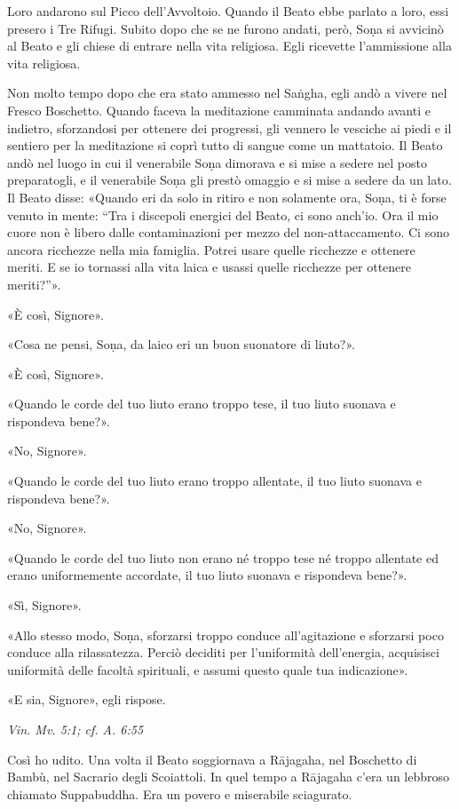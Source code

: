 Loro andarono sul Picco dell’Avvoltoio. Quando il Beato ebbe parlato a
loro, essi presero i Tre Rifugi. Subito dopo che se ne furono andati,
però, Soṇa si avvicinò al Beato e gli chiese di entrare nella vita
religiosa. Egli ricevette l’ammissione alla vita religiosa.


Non molto tempo dopo che era stato ammesso nel Saṅgha, egli andò a
vivere nel Fresco Boschetto. Quando faceva la meditazione camminata
andando avanti e indietro, sforzandosi per ottenere dei progressi, gli
vennero le vesciche ai piedi e il sentiero per la meditazione si coprì
tutto di sangue come un mattatoio. Il Beato andò nel luogo in cui il
venerabile Soṇa dimorava e si mise a sedere nel posto preparatogli, e il
venerabile Soṇa gli prestò omaggio e si mise a sedere da un lato. Il
Beato disse: «Quando eri da solo in ritiro e non solamente ora, Soṇa, ti
è forse venuto in mente: “Tra i discepoli energici del Beato, ci sono
anch’io. Ora il mio cuore non è libero dalle contaminazioni per mezzo
del non-attaccamento. Ci sono ancora ricchezze nella mia famiglia.
Potrei usare quelle ricchezze e ottenere meriti. E se io tornassi alla
vita laica e usassi quelle ricchezze per ottenere meriti?”».


«È così, Signore».


«Cosa ne pensi, Soṇa, da laico eri un buon suonatore di liuto?».


«È così, Signore».


«Quando le corde del tuo liuto erano troppo tese, il tuo liuto suonava e
rispondeva bene?».


«No, Signore».


«Quando le corde del tuo liuto erano troppo allentate, il tuo liuto
suonava e rispondeva bene?».


«No, Signore».


«Quando le corde del tuo liuto non erano né troppo tese né troppo
allentate ed erano uniformemente accordate, il tuo liuto suonava e
rispondeva bene?».


«Sì, Signore».


«Allo stesso modo, Soṇa, sforzarsi troppo conduce all’agitazione e
sforzarsi poco conduce alla rilassatezza. Perciò deciditi per
l’uniformità dell’energia, acquisisci uniformità delle facoltà
spirituali, e assumi questo quale tua indicazione».


«E sia, Signore», egli rispose.


\emph{Vin. Mv. 5:1; cf. A. 6:55}


 Così ho udito. Una volta il Beato soggiornava a Rājagaha,
nel Boschetto di Bambù, nel Sacrario degli Scoiattoli. In quel tempo a
Rājagaha c’era un lebbroso chiamato Suppabuddha. Era un povero e
miserabile sciagurato.


